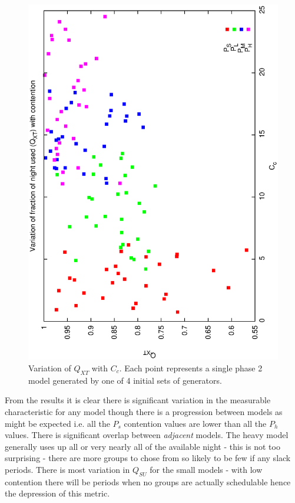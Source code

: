 \begin{figure}[h]
 \label{fig:p2_gen_xt}
\begin{center}
 \includegraphics[scale=0.5, angle=-90]{figures/p2_gen_qxt.eps}
 \caption[Variation of $Q_{XT}$ with $C_C$ for variable phase2 generator models.] 
   {Variation of $Q_{XT}$ with $C_c$. Each point represents a single phase 2 model generated by one of 4 initial sets of generators.}
\end{center}
\end{figure}

From the results it is clear there is significant variation in the measurable characteristic for any model though there is a progression between models as might be expected i.e. all the $P_s$ contention values are lower than all the $P_h$ values. There is significant overlap between \emph{adjacent} models. The heavy model generally uses up all or very nearly all of the available night - this is not too surprising - there are more groups to chose from so likely to be few if any slack periods. There is most variation in $Q_{SU}$ for the small models - with low contention there will be periods when no groups are actually schedulable hence the depression of this metric.

